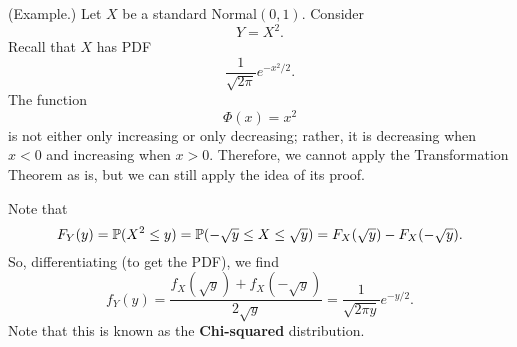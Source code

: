\begin{mdframed}[]
    (Example.) Let $X$ be a standard Normal$(0, 1)$. Consider \[Y = X^2.\] Recall that $X$ has PDF \[\frac{1}{\sqrt{2\pi}} e^{-x^2 / 2}.\] The function \[\Phi(x) = x^2\] is not either only increasing or only decreasing; rather, it is decreasing when $x < 0$ and increasing when $x > 0$. Therefore, we cannot apply the Transformation Theorem as is, but we can still apply the idea of its proof. 

    \bigskip 

    Note that \[F_{Y}(y) = \mathbb{P}(X^2 \leq y) = \mathbb{P}(-\sqrt{y} \leq X \leq \sqrt{y}) = F_{X}(\sqrt{y}) - F_{X}(-\sqrt{y}).\] So, differentiating (to get the PDF), we find \[f_{Y}(y) = \frac{f_{X}(\sqrt{y}) + f_{X}(-\sqrt{y})}{2\sqrt{y}} = \frac{1}{\sqrt{2\pi y}} e^{-y / 2}.\]
    Note that this is known as the \textbf{Chi-squared} distribution.
\end{mdframed}